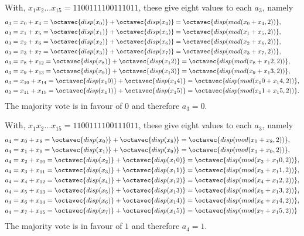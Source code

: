 \begin{enumerate}[label=(\roman*)]
With, $x_1x_2\ldots x_{15}=1100111100111011$, these give eight values to each $a_3$, namely
\begin{align*}
	a_3 &= x_0 + x_4
	= \octavec{disp(x_0)}+ \octavec{disp(x_4)} = \octavec{disp(mod(x_0+x_4,2))},\\
	a_3 &= x_1 + x_5
	= \octavec{disp(x_1)}+ \octavec{disp(x_5)} = \octavec{disp(mod(x_1+x_5,2))},\\
	a_3 &= x_2 + x_6
	= \octavec{disp(x_2)}+ \octavec{disp(x_6)} = \octavec{disp(mod(x_2+x_6,2))},\\
	a_3 &= x_3 + x_7
	= \octavec{disp(x_3)}+ \octavec{disp(x_7)} = \octavec{disp(mod(x_3+x_7,2))},\\
	a_3 &= x_8 + x_{12}
	= \octavec{disp(x_8)}+ \octavec{disp(x_12)} = \octavec{disp(mod(x_8+x_12,2))},\\
	a_3 &= x_{9} + x_{13}
	= \octavec{disp(x_9)}+ \octavec{disp(x_13)} = \octavec{disp(mod(x_9+x_13,2))},\\
	a_3 &= x_{10} + x_{14}
	= \octavec{disp(x_10)}+ \octavec{disp(x_14)} = \octavec{disp(mod(x_10+x_14,2))},\\
	a_3 &= x_{11} + x_{15}
	= \octavec{disp(x_11)}+ \octavec{disp(x_15)} = \octavec{disp(mod(x_11+x_15,2))}.
\end{align*}
The majority vote is in favour of $0$ and therefore $a_3 = 0$.

With, $x_1x_2\ldots x_{15}=1100111100111011$, these give eight values to each $a_3$, namely
\begin{align*}
	a_4 &= x_0 + x_8
	= \octavec{disp(x_0)}+ \octavec{disp(x_8)} = \octavec{disp(mod(x_0+x_8,2))},\\
	a_4 &= x_1 + x_9
	= \octavec{disp(x_1)}+ \octavec{disp(x_9)} = \octavec{disp(mod(x_1+x_9,2))},\\
	a_4 &= x_2 + x_{10}
	= \octavec{disp(x_2)}+ \octavec{disp(x_10)} = \octavec{disp(mod(x_2+x_10,2))},\\
	a_4 &= x_3 + x_{11}
	= \octavec{disp(x_3)}+ \octavec{disp(x_11)} = \octavec{disp(mod(x_3+x_11,2))},\\
	a_4 &= x_4 + x_{12}
	= \octavec{disp(x_4)}+ \octavec{disp(x_12)} = \octavec{disp(mod(x_4+x_12,2))},\\
	a_4 &= x_{5} + x_{13}
	= \octavec{disp(x_5)}+ \octavec{disp(x_13)} = \octavec{disp(mod(x_5+x_13,2))},\\
	a_4 &= x_{6} + x_{14}
	= \octavec{disp(x_6)}+ \octavec{disp(x_14)} = \octavec{disp(mod(x_6+x_14,2))},\\
	a_4 &= x_{7} + x_{15}
	= \octavec{disp(x_7)}+ \octavec{disp(x_15)} = \octavec{disp(mod(x_7+x_15,2))}
\end{align*}
The majority vote is in favour of $1$ and therefore $a_4 = 1$.


\end{enumerate}

